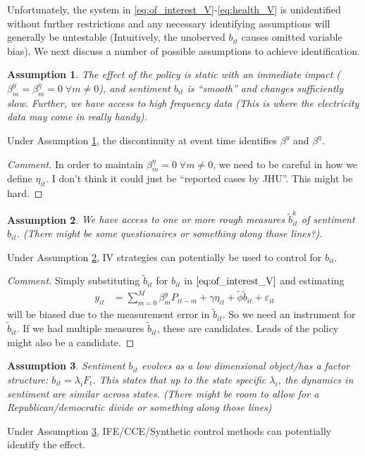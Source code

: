 \documentclass{article}[12pt]
\newtheorem{ass}{Assumption}
\begin{document}
Unfortunately, the system in \eqref{eq:of_interest_V}-\eqref{eq:health_V} is unidentified without further restrictions and any necessary identifying assumptions will generally be untestable (Intuitively, the unoberved $b_{it}$ causes omitted variable bias). We next discuss a number of possible assumptions to achieve identification.
\begin{ass}\label{ass:RD}
The effect of the policy is static with an immediate impact ($\beta^y_m = \beta^\eta_m= 0 \; \forall m \ne 0$), and sentiment $b_{it}$ is ``smooth'' and changes sufficiently slow. Further, we have access to high frequency data (This is where the electricity data may come in really handy). 
\end{ass}
Under Assumption \ref{ass:RD}, the discontinuity at event time identifies $\beta^y$ and $\beta^\eta$.
\begin{proof}[Comment]
In order to maintain $\beta^\eta_m= 0 \; \forall m \ne 0$, we need to be careful in how we define $\eta_{it}$. I don't think it could just be ``reported cases by JHU''. This might be hard.
\end{proof}

\begin{ass} \label{ass:IV}
We have access to one or more rough measures $\tilde b^k_{it}$ of sentiment $b_{it}$. (There might be some questionaires or something along those lines?).
\end{ass}
Under Assumption \ref{ass:IV}, IV strategies can potentially be used to control for $b_{it}$.
\begin{proof}[Comment]
Simply substituting $\tilde b_{it}$ for $b_{it}$ in $\eqref{eq:of_interest_V}$ and estimating
\begin{align}
y_{it} &=  \sum_{m=0}^M \beta^y_m P_{it-m} + \gamma \eta_{it} + \tilde \phi \tilde b_{it} + \varepsilon_{it}
\end{align}
will be biased due to the measurement error in $\tilde b_{it}$. So we need an instrument for $\tilde b_{it}$. If we had multiple measures $\tilde b_{it}$, these are candidates. Leads of the policy might also be a candidate.
\end{proof}

\begin{ass} \label{ass:FS}
Sentiment $b_{it}$ evolves as a low dimensional object/has a factor structure: $b_{it}=\lambda_i F_t$. This states that up to the state specific $\lambda_i$, the dynamics in sentiment are similar across states. (There might be room to allow for a Republican/democratic divide or something along those lines)
\end{ass}
Under Assumption \ref{ass:FS}, IFE/CCE/Synthetic control methods can potentially identify the effect.

\end{document}
